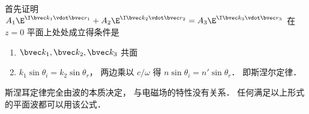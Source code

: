 


首先证明 $A_1 \E^{\I \bvec k_1 \vdot \bvec r_1} + A_2 \E^{\I \bvec k_2 \vdot \bvec r_2} = A_3 \E^{\I \bvec k_3 \vdot \bvec r_3}$ 在 $z = 0$ 平面上处处成立得条件是

\begin{enumerate}
\item $\bvec k_1, \bvec k_2, \bvec k_3$ 共面
\item $k_1 \sin \theta_i = k_2 \sin \theta_r$， 两边乘以 $c/\omega$ 得 $n \sin\theta_i = n' \sin \theta_r$． 即斯涅尔定律．
\end{enumerate}
斯涅耳定律完全由波的本质决定， 与电磁场的特性没有关系． 任何满足以上形式的平面波都可以用该公式．
